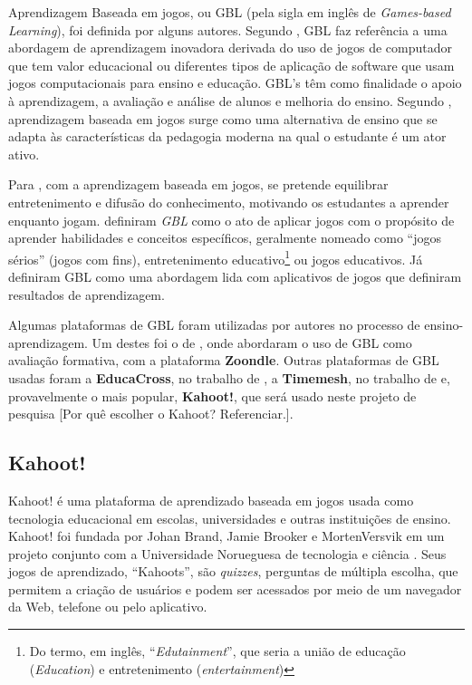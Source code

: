 Aprendizagem Baseada em jogos, ou GBL (pela sigla em inglês de \textit{Games-based Learning}), foi definida por alguns autores. Segundo , GBL faz referência a uma abordagem de aprendizagem inovadora derivada do uso de jogos de computador que tem valor educacional ou diferentes tipos de aplicação de software que usam jogos computacionais para ensino e educação. GBL's têm como finalidade o apoio à aprendizagem, a avaliação e análise de alunos e melhoria do ensino. Segundo , aprendizagem baseada em jogos surge como uma alternativa de ensino que se adapta às características da pedagogia moderna na qual o estudante é um ator ativo.

Para , com a aprendizagem baseada em jogos, se pretende equilibrar entretenimento e difusão do conhecimento, motivando os estudantes a aprender enquanto jogam.  definiram \textit{GBL} como o ato de aplicar jogos com o propósito de aprender habilidades e conceitos específicos, geralmente nomeado como “jogos sérios” (jogos com fins), entretenimento educativo\footnote{Do termo, em inglês, “\textit{Edutainment}”, que seria a união de educação (\textit{Education}) e entretenimento (\textit{entertainment})} ou jogos educativos. Já  definiram GBL como uma abordagem lida com aplicativos de jogos que definiram resultados de aprendizagem.

Algumas plataformas de GBL foram utilizadas por autores no processo de ensino-aprendizagem. Um destes foi o de , onde abordaram o uso de GBL como avaliação formativa, com a plataforma \textbf{Zoondle}. Outras plataformas de GBL usadas foram a \textbf{EducaCross}, no trabalho de , a \textbf{Timemesh}, no trabalho de  e, provavelmente o mais popular, \textbf{Kahoot!}, que será usado neste projeto de pesquisa {\color{red}[Por quê escolher o Kahoot? Referenciar.]}.

\subsection{Kahoot!} \label{sec:Kahoot!}
Kahoot! é uma plataforma de aprendizado baseada em jogos usada como tecnologia educacional em escolas, universidades e outras instituições de ensino. Kahoot! foi fundada por Johan Brand, Jamie Brooker e MortenVersvik em um projeto conjunto com a Universidade Norueguesa de tecnologia e ciência \cite{kahoot2018}. Seus jogos de aprendizado, ``Kahoots'', são \textit{quizzes}, perguntas de múltipla escolha, que permitem a criação de usuários e podem ser acessados por meio de um navegador da Web, telefone ou pelo aplicativo.

